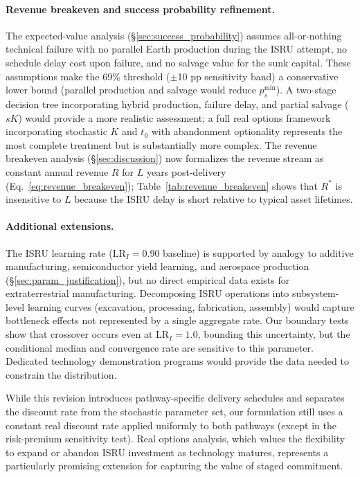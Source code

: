 \documentclass[preprint,12pt]{elsarticle}
\begin{document}
\paragraph{Revenue breakeven and success probability refinement.} The expected-value analysis (\S\ref{sec:success_probability}) assumes all-or-nothing technical failure with no parallel Earth production during the ISRU attempt, no schedule delay cost upon failure, and no salvage value for the sunk capital. These assumptions make the 69\% threshold ($\pm$10 pp sensitivity band) a conservative lower bound (parallel production and salvage would reduce $p_s^{\min}$). A two-stage decision tree incorporating hybrid production, failure delay, and partial salvage ($sK$) would provide a more realistic assessment; a full real options framework \cite{dixit1994} incorporating stochastic $K$ and $t_0$ with abandonment optionality represents the most complete treatment but is substantially more complex. The revenue breakeven analysis (\S\ref{sec:discussion}) now formalizes the revenue stream as constant annual revenue $R$ for $L$ years post-delivery (Eq.~\ref{eq:revenue_breakeven}); Table~\ref{tab:revenue_breakeven} shows that $R^*$ is insensitive to $L$ because the ISRU delay is short relative to typical asset lifetimes.

\paragraph{Additional extensions.} The ISRU learning rate ($\mathrm{LR}_I = 0.90$ baseline) is supported by analogy to additive manufacturing, semiconductor yield learning, and aerospace production (\S\ref{sec:param_justification}), but no direct empirical data exists for extraterrestrial manufacturing. Decomposing ISRU operations into subsystem-level learning curves (excavation, processing, fabrication, assembly) would capture bottleneck effects not represented by a single aggregate rate. Our boundary tests show that crossover occurs even at $\mathrm{LR}_I = 1.0$, bounding this uncertainty, but the conditional median and convergence rate are sensitive to this parameter. Dedicated technology demonstration programs would provide the data needed to constrain the distribution.

While this revision introduces pathway-specific delivery schedules and separates the discount rate from the stochastic parameter set, our formulation still uses a constant real discount rate applied uniformly to both pathways (except in the risk-premium sensitivity test). Real options analysis, which values the flexibility to expand or abandon ISRU investment as technology matures, represents a particularly promising extension for capturing the value of staged commitment.
\end{document}
